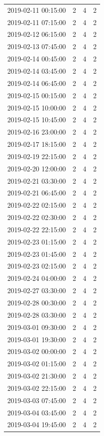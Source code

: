 \begin{tabular}{lrrr}
2019-02-11 00:15:00 & 2 & 4 & 2 \\
2019-02-11 07:15:00 & 2 & 4 & 2 \\
2019-02-12 06:15:00 & 2 & 4 & 2 \\
2019-02-13 07:45:00 & 2 & 4 & 2 \\
2019-02-14 00:45:00 & 2 & 4 & 2 \\
2019-02-14 03:45:00 & 2 & 4 & 2 \\
2019-02-14 06:45:00 & 2 & 4 & 2 \\
2019-02-15 00:15:00 & 2 & 4 & 2 \\
2019-02-15 10:00:00 & 2 & 4 & 2 \\
2019-02-15 10:45:00 & 2 & 4 & 2 \\
2019-02-16 23:00:00 & 2 & 4 & 2 \\
2019-02-17 18:15:00 & 2 & 4 & 2 \\
2019-02-19 22:15:00 & 2 & 4 & 2 \\
2019-02-20 12:00:00 & 2 & 4 & 2 \\
2019-02-21 03:30:00 & 2 & 4 & 2 \\
2019-02-21 06:45:00 & 2 & 4 & 2 \\
2019-02-22 02:15:00 & 2 & 4 & 2 \\
2019-02-22 02:30:00 & 2 & 4 & 2 \\
2019-02-22 22:15:00 & 2 & 4 & 2 \\
2019-02-23 01:15:00 & 2 & 4 & 2 \\
2019-02-23 01:45:00 & 2 & 4 & 2 \\
2019-02-23 02:15:00 & 2 & 4 & 2 \\
2019-02-24 04:00:00 & 2 & 4 & 2 \\
2019-02-27 03:30:00 & 2 & 4 & 2 \\
2019-02-28 00:30:00 & 2 & 4 & 2 \\
2019-02-28 03:30:00 & 2 & 4 & 2 \\
2019-03-01 09:30:00 & 2 & 4 & 2 \\
2019-03-01 19:30:00 & 2 & 4 & 2 \\
2019-03-02 00:00:00 & 2 & 4 & 2 \\
2019-03-02 01:15:00 & 2 & 4 & 2 \\
2019-03-02 21:30:00 & 2 & 4 & 2 \\
2019-03-02 22:15:00 & 2 & 4 & 2 \\
2019-03-03 07:45:00 & 2 & 4 & 2 \\
2019-03-04 03:45:00 & 2 & 4 & 2 \\
2019-03-04 19:45:00 & 2 & 4 & 2 \\

\end{tabular}
